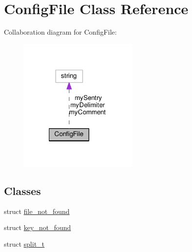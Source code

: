\hypertarget{classConfigFile}{\section{Config\+File Class Reference}
\label{classConfigFile}
}


Collaboration diagram for Config\+File\+:
\nopagebreak
\begin{figure}[H]
\begin{center}
\leavevmode
\includegraphics[width=167pt]{classConfigFile__coll__graph}
\end{center}
\end{figure}
\subsection*{Classes}
\begin{DoxyCompactItemize}
\item 
struct \hyperlink{structConfigFile_1_1file__not__found}{file\+\_\+not\+\_\+found}
\item 
struct \hyperlink{structConfigFile_1_1key__not__found}{key\+\_\+not\+\_\+found}
\item 
struct \hyperlink{structConfigFile_1_1split__t}{split\+\_\+t}
\end{DoxyCompactItemize}
